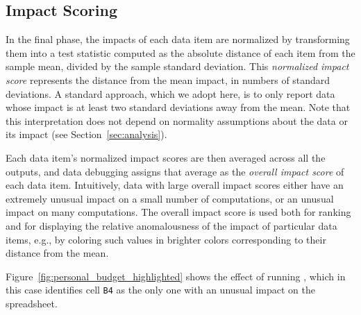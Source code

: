 \subsection{Impact Scoring}

In the final phase, the impacts of each data item are normalized by transforming
them into a test statistic computed as the absolute distance of
each item from the sample mean, divided by the sample standard
deviation. This \emph{normalized impact score} represents the distance
from the mean impact, in numbers of standard deviations. A standard
approach, which we adopt here, is to only report data whose impact is
at least two standard deviations away from the mean.  Note
that this interpretation does not depend on normality assumptions
about the data or its impact (see Section~\ref{sec:analysis}).

Each data item's normalized impact scores are then averaged across
all the outputs, and data debugging assigns that average as the
\emph{overall impact score} of each data item. Intuitively, data with
large overall impact scores either have an extremely unusual impact on a
small number of computations, or an unusual impact on many
computations. The overall impact score is used both for ranking and
for displaying the relative anomalousness of the impact of particular
data items, e.g., by coloring such values in brighter colors
corresponding to their distance from the mean.

Figure~\ref{fig:personal_budget_highlighted} shows the effect of
running \checkcell{}, which in this case identifies cell \texttt{B4}
as the only one with an unusual impact on the spreadsheet.



